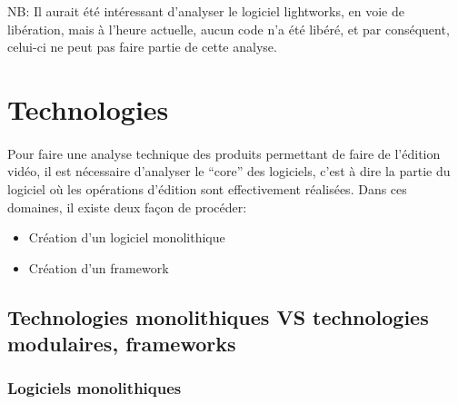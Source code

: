 NB: Il aurait été intéressant d'analyser le logiciel lightworks,
en voie de libération, mais à l'heure actuelle, aucun code n'a été
libéré, et par conséquent, celui-ci ne peut pas faire partie de
cette analyse.

\newpage

\section{Technologies}

\paragraph{}

Pour faire une analyse technique des produits permettant de faire
de l'édition vidéo, il est nécessaire d'analyser le ``core'' des
logiciels, c'est à dire la partie du logiciel où les opérations
d'édition sont effectivement réalisées. Dans ces domaines, il existe
deux façon de procéder:

\begin{itemize} \setlength{\itemsep}{2mm}

  \item{Création d'un logiciel monolithique}

  \item{Création d'un framework 
   }

\end{itemize}

\subsection {Technologies monolithiques VS
technologies modulaires, frameworks}


\subsubsection{Logiciels monolithiques }

\paragraph{}

